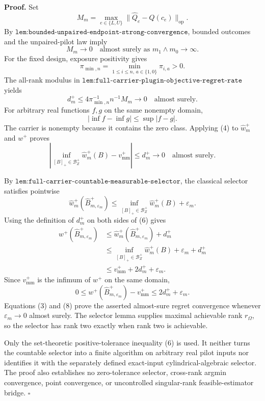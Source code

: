 \textbf{Proof.}
Set
\[
M_m=\max_{e\in\{L,U\}}
\lVert\widehat Q_e-Q(c_e)\rVert_{\mathrm{op}}.
\]
By \(\texttt{lem:bounded-unpaired-endpoint-strong-convergence}\), bounded outcomes and the unpaired-pilot law imply
\[
M_m\longrightarrow0
\quad\text{almost surely as }m_1\wedge m_0\to\infty.
\tag{1}
\]
For the fixed design, exposure positivity gives
\[
\pi_{\min,n}=\min_{1\le i\le n,\,a\in\{1,0\}}\pi_{i,a}>0.
\tag{2}
\]
The all-rank modulus in \(\texttt{lem:full-carrier-plugin-objective-regret-rate}\) yields
\[
d_m^+
\le4\pi_{\min,n}^{-1}n^{-1}M_m
\longrightarrow0
\quad\text{almost surely}.
\tag{3}
\]
For arbitrary real functions \(f,g\) on the same nonempty domain,
\[
|\inf f-\inf g|\le\sup|f-g|.
\tag{4}
\]
The carrier is nonempty because it contains the zero class.  Applying (4) to \(\widehat w_m^+\) and \(w^+\) proves
\[
\left|
\inf_{[B]_+\in\mathcal B_Z^+}\widehat w_m^+(B)
-v_{\mathrm{mm}}^+
\right|
\le d_m^+\longrightarrow0
\quad\text{almost surely}.
\tag{5}
\]

By \(\texttt{lem:full-carrier-countable-measurable-selector}\), the classical selector satisfies pointwise
\[
\widehat w_m^+(\widehat B_{m,\varepsilon_m}^+)
\le
\inf_{[B]_+\in\mathcal B_Z^+}\widehat w_m^+(B)+\varepsilon_m.
\tag{6}
\]
Using the definition of \(d_m^+\) on both sides of (6) gives
\[
\begin{aligned}
w^+(\widehat B_{m,\varepsilon_m}^+)
&\le\widehat w_m^+(\widehat B_{m,\varepsilon_m}^+)+d_m^+\\
&\le\inf_{[B]_+\in\mathcal B_Z^+}\widehat w_m^+(B)
+\varepsilon_m+d_m^+\\
&\le v_{\mathrm{mm}}^++2d_m^++\varepsilon_m.
\end{aligned}
\tag{7}
\]
Since \(v_{\mathrm{mm}}^+\) is the infimum of \(w^+\) on the same domain,
\[
0\le w^+(\widehat B_{m,\varepsilon_m}^+)-v_{\mathrm{mm}}^+
\le2d_m^++\varepsilon_m.
\tag{8}
\]
Equations (3) and (8) prove the asserted almost-sure regret convergence whenever \(\varepsilon_m\to0\) almost surely.  The selector lemma supplies maximal achievable rank \(r_\Omega\), so the selector has rank two exactly when rank two is achievable.

Only the set-theoretic positive-tolerance inequality (6) is used.  It neither turns the countable selector into a finite algorithm on arbitrary real pilot inputs nor identifies it with the separately defined exact-input cylindrical-algebraic selector.  The proof also establishes no zero-tolerance selector, cross-rank argmin convergence, point convergence, or uncontrolled singular-rank feasible-estimator bridge. \(\square\)